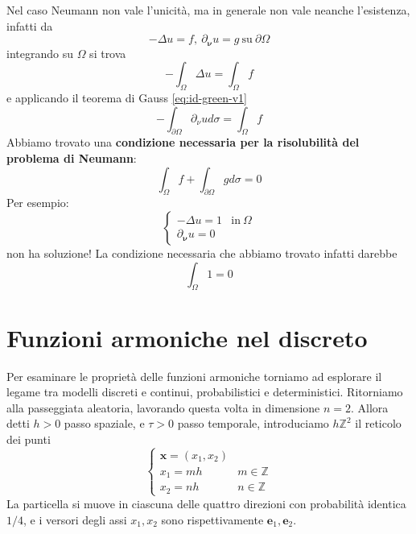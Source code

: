 \documentclass[10pt,a4paper,twoside,openright]{book}
\newcommand{\x}{\mathbf{x}}
\begin{document}
Nel caso Neumann non vale l'unicità, ma in generale non vale neanche l'esistenza, infatti da 
\begin{equation*}
	-\Delta u=f,\ \partial _{\bm{\nu}} u=g\ \text{su} \ \partial \Omega 
\end{equation*}
integrando su $\displaystyle \Omega $ si trova
\begin{equation*}
	-\int _{\Omega } \Delta u=\int _{\Omega } f
\end{equation*}
e applicando il teorema di Gauss \eqref{eq:id-green-v1}
\begin{equation*}
-\int _{\partial \Omega } \partial _{\nu } ud\sigma =\int _{\Omega } f
\end{equation*}
Abbiamo trovato una \textbf{condizione necessaria per la risolubilità del problema di Neumann}:
\begin{equation}
\boxed{\int _{\Omega } f+\int _{\partial \Omega } gd\sigma =0}
\end{equation}
Per esempio:
\begin{equation*}
	\begin{cases}
		-\Delta u=1          & \text{in} \ \Omega \\
		\partial _{\bm{\nu}} u=0 &                    
	\end{cases}
\end{equation*}
non ha soluzione! La condizione necessaria che abbiamo trovato infatti darebbe
\begin{equation*}
	\int _{\Omega } 1=0
\end{equation*}
\section{Funzioni armoniche nel discreto}

Per esaminare le proprietà delle funzioni armoniche torniamo ad esplorare il legame tra modelli discreti e continui, probabilistici e deterministici. Ritorniamo alla passeggiata aleatoria, lavorando questa volta in dimensione $\displaystyle n=2$. Allora detti $\displaystyle h >0$ passo spaziale, e $\displaystyle \tau  >0$ passo temporale, introduciamo $\displaystyle h\mathbb{Z}^{2}$ il reticolo dei punti 
\begin{equation*}
	\begin{cases}
		\x=(x_{1},x_{2}) &                 \\
		x_{1} =mh         & m\in \mathbb{Z} \\
		x_{2} =nh         & n\in \mathbb{Z} 
	\end{cases}
\end{equation*}
La particella si muove in ciascuna delle quattro direzioni con probabilità identica $\displaystyle 1/4$, e i versori degli assi $\displaystyle x_{1},x_{2}$ sono rispettivamente $\displaystyle \mathbf{e}_{1},\mathbf{e}_{2}$.
\end{document}
